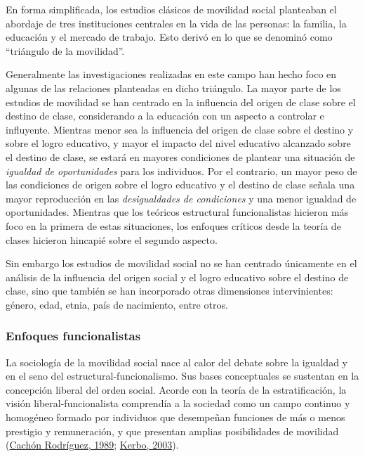 \documentclass[
]{article}
\begin{document}
En forma simplificada, los estudios clásicos de movilidad social planteaban el abordaje de tres instituciones centrales en la vida de las personas: la familia, la educación y el mercado de trabajo. Esto derivó en lo que se denominó como ``triángulo de la movilidad''.

Generalmente las investigaciones realizadas en este campo han hecho foco en algunas de las relaciones planteadas en dicho triángulo. La mayor parte de los estudios de movilidad se han centrado en la influencia del origen de clase sobre el destino de clase, considerando a la educación con un aspecto a controlar e influyente. Mientras menor sea la influencia del origen de clase sobre el destino y sobre el logro educativo, y mayor el impacto del nivel educativo alcanzado sobre el destino de clase, se estará en mayores condiciones de plantear una situación de \emph{igualdad de oportunidades} para los individuos. Por el contrario, un mayor peso de las condiciones de origen sobre el logro educativo y el destino de clase señala una mayor reproducción en las \emph{desigualdades de condiciones} y una menor igualdad de oportunidades. Mientras que los teóricos estructural funcionalistas hicieron más foco en la primera de estas situaciones, los enfoques críticos desde la teoría de clases hicieron hincapié sobre el segundo aspecto.

Sin embargo los estudios de movilidad social no se han centrado únicamente en el análisis de la influencia del origen social y el logro educativo sobre el destino de clase, sino que también se han incorporado otras dimensiones intervinientes: género, edad, etnia, país de nacimiento, entre otros.

\hypertarget{enfoques-funcionalistas}{%
\subsubsection{Enfoques funcionalistas}\label{enfoques-funcionalistas}}

La sociología de la movilidad social nace al calor del debate sobre la igualdad y en el seno del estructural-funcionalismo. Sus bases conceptuales se sustentan en la concepción liberal del orden social. Acorde con la teoría de la estratificación, la visión liberal-funcionalista comprendía a la sociedad como un campo continuo y homogéneo formado por individuos que desempeñan funciones de más o menos prestigio y remuneración, y que presentan amplias posibilidades de movilidad (\protect\hyperlink{ref-CachonRodriguez1989}{Cachón Rodríguez, 1989}; \protect\hyperlink{ref-Kerbo2003}{Kerbo, 2003}).
\end{document}
